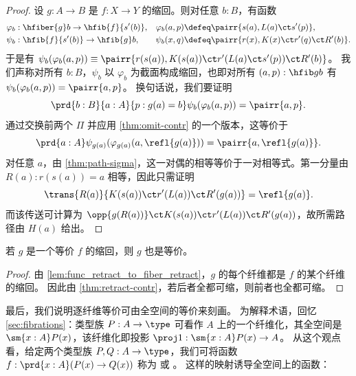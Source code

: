 \begin{proof}
设 $g:A\to B$ 是 $f:X\to Y$ 的缩回。则对任意 $b:B$，有函数
\begin{align*}
\varphi_b &: \hfiber{g}b\to\hfib{f}{s'(b)}, &
\varphi_b(a,p) & \defeq \pairr{s(a),L(a)\ct s'(p)},\\
\psi_b &: \hfib{f}{s'(b)}\to\hfib{g}b, &
\psi_b(x,q) &\defeq \pairr{r(x),K(x)\ct r'(q)\ct R'(b)}.
\end{align*}
于是有 $\psi_b(\varphi_b({a,p}))\equiv\pairr{r(s(a)),K(s(a))\ct r'(L(a)\ct s'(p))\ct R'(b)}$。
我们声称对所有 $b:B$，$\psi_b$ 以 $\varphi_b$ 为截面构成缩回，也即对所有 $(a,p):\hfib g b$ 有 $\psi_b(\varphi_b({a,p}))= \pairr{a,p}$。
换句话说，我们要证明
\begin{equation*}
\prd{b:B}{a:A}{p:g(a)=b} \psi_b(\varphi_b({a,p}))= \pairr{a,p}.
\end{equation*}
通过交换前两个 $\Pi$ 并应用 \cref{thm:omit-contr} 的一个版本，这等价于
\begin{equation*}
\prd{a:A}\psi_{g(a)}(\varphi_{g(a)}({a,\refl{g(a)}}))=\pairr{a,\refl{g(a)}}.
\end{equation*}
对任意 $a$，由 \cref{thm:path-sigma}，这一对偶的相等等价于一对相等式。第一分量由 $R(a):r(s(a))= a$ 相等，因此只需证明
\begin{equation*}
\trans{R(a)}{K(s(a))\ct r'(L(a))\ct R'(g(a))} = \refl{g(a)}.
\end{equation*}
而该传送可计算为 $\opp{g(R(a))}\ct K(s(a))\ct r'(L(a))\ct R'(g(a))$，故所需路径由 $H(a)$ 给出。
\end{proof}

\begin{thm}\label{thm:retract-equiv}
  若 $g$ 是一个等价 $f$ 的缩回，则 $g$ 也是等价。
\end{thm}
\begin{proof}
  由 \cref{lem:func_retract_to_fiber_retract}，$g$ 的每个纤维都是 $f$ 的某个纤维的缩回。
  因此由 \cref{thm:retract-contr}，若后者全都可缩，则前者也全都可缩。
\end{proof}

%

%
%
最后，我们说明逐纤维等价可由全空间的等价来刻画。
为解释术语，回忆 \cref{sec:fibrations}：类型族 $P:A\to\type$ 可看作 $A$ 上的一个纤维化，其全空间是 $\sm{x:A} P(x)$，该纤维化即投影 $\proj1:\sm{x:A} P(x) \to A$。
从这个观点看，给定两个类型族 $P,Q:A\to\type$，我们可将函数 $f:\prd{x:A} (P(x)\to Q(x))$ 称为  或 。
%
%
%
%
这样的映射诱导全空间上的函数：

